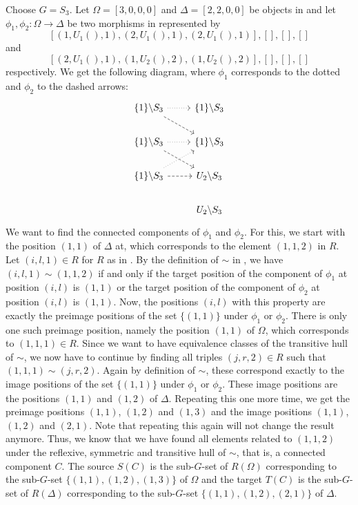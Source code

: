 \begin{exmp}\label{exmp:finding_connected_components}
Choose $G = S_3$. Let $\Omega = [3,0,0,0]$ and $\Delta = [2,2,0,0]$ be objects in \SkeletalGSets{} and let $\phi_1,\phi_2\colon \Omega \to \Delta$ be two morphisms in \SkeletalGSets{} represented by \[[(1,U_1(),1),(2,U_1(),1),(2,U_1(),1)],[],[],[]\] and \[[(2,U_1(),1),(1,U_2(),2),(1,U_2(),2)],[],[],[]\] respectively. We get the following diagram, where $\phi_1$ corresponds to the dotted and $\phi_2$ to the dashed arrows:
\[
\begin{tikzcd}
\{1\} \backslash S_3 \arrow[r, dotted] \arrow[rd, dashed] & \{1\} \backslash S_3   \\
\{1\} \backslash S_3 \arrow[r, dotted] \arrow[rd, dashed] & \{1\} \backslash S_3   \\
\{1\} \backslash S_3 \arrow[r, dashed] \arrow[ru, dotted] & U_2 \backslash S_3 \\
                                                      & U_2 \backslash S_3
\end{tikzcd}
\]
We want to find the connected components of $\phi_1$ and $\phi_2$. For this, we start with the position $(1,1)$ of $\Delta$ at, which corresponds to the element $(1,1,2)$ in $R$. Let $(i,l,1) \in R$ for $R$ as in . By the definition of $\sim$ in , we have $(i,l,1) \sim (1,1,2)$ if and only if the target position of the component of $\phi_1$ at position $(i,l)$ is $(1,1)$ or the target position of the component of $\phi_2$ at position $(i,l)$ is $(1,1)$. Now, the positions $(i,l)$ with this property are exactly the preimage positions of the set $\{(1,1)\}$ under $\phi_1$ or $\phi_2$. There is only one such preimage position, namely the position $(1,1)$ of $\Omega$, which corresponds to $(1,1,1) \in R$. Since we want to have equivalence classes of the transitive hull of $\sim$, we now have to continue by finding all triples $(j,r,2) \in R$ such that $(1,1,1) \sim (j,r,2)$. Again by definition of $\sim$, these correspond exactly to the image positions of the set $\{(1,1)\}$ under $\phi_1$ or $\phi_2$. These image positions are the positions $(1,1)$ and $(1,2)$ of $\Delta$. Repeating this one more time, we get the preimage positions $(1,1)$, $(1,2)$ and $(1,3)$ and the image positions $(1,1)$, $(1,2)$ and $(2,1)$. Note that repeating this again will not change the result anymore. Thus, we know that we have found all elements related to $(1,1,2)$ under the reflexive, symmetric and transitive hull of $\sim$, that is, a connected component $C$. The source $S(C)$ is the sub-$G$-set of $R(\Omega)$ corresponding to the sub-$G$-set $\{(1,1), (1,2), (1,3)\}$ of $\Omega$ and the target $T(C)$ is the sub-$G$-set of $R(\Delta)$ corresponding to the sub-$G$-set $\{(1,1), (1,2), (2,1)\}$ of $\Delta$.


\end{exmp}
